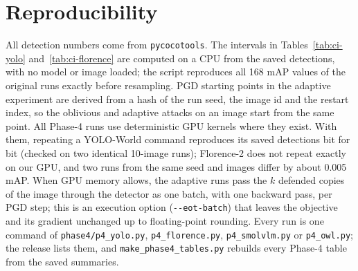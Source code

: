 \documentclass[11pt]{article}
\newcommand{\yw}{YOLO-World}
\newcommand{\fl}{Florence-2}
\begin{document}
\section{Reproducibility}

All detection numbers come from \texttt{pycocotools}. The intervals in
Tables~\ref{tab:ci-yolo} and~\ref{tab:ci-florence} are computed on a CPU from
the saved detections, with no model or image loaded; the script reproduces
all 168 mAP values of the original runs exactly before resampling. PGD
starting points in the adaptive experiment are derived from a hash of the
run seed, the image id and the restart index, so the oblivious and adaptive
attacks on an image start from the same point. All Phase-4 runs use
deterministic GPU kernels where they exist. With them, repeating a \yw{}
command reproduces its saved detections bit for bit (checked on two
identical 10-image runs); \fl{} does not repeat exactly on our GPU, and two
runs from the same seed and images differ by about 0.005 mAP.
When GPU memory allows, the adaptive runs pass the $k$ defended copies of the
image through the detector as one batch, with one backward pass, per PGD
step; this is an execution option (\texttt{-{}-eot-batch}) that leaves the
objective and its gradient unchanged up to floating-point rounding. Every
run is one command of \texttt{phase4/p4\_yolo.py},
\texttt{p4\_florence.py}, \texttt{p4\_smolvlm.py} or \texttt{p4\_owl.py};
the release lists them, and \texttt{make\_phase4\_tables.py} rebuilds every
Phase-4 table from the saved summaries.
\end{document}
